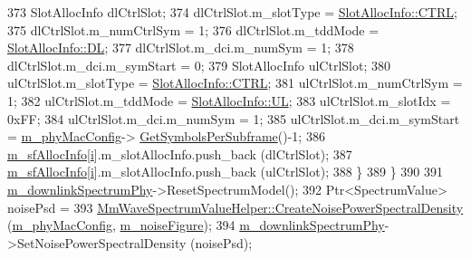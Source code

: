 \begin{DoxyCode}
373                         SlotAllocInfo dlCtrlSlot;
374                         dlCtrlSlot.m\_slotType = \hyperlink{structns3_1_1SlotAllocInfo_a3ea7cb503bfd0c9a4df55a71b81b9331ad78b7d76ef82d56c33be1fa9c1867409}{SlotAllocInfo::CTRL};
375                         dlCtrlSlot.m\_numCtrlSym = 1;
376                         dlCtrlSlot.m\_tddMode = \hyperlink{structns3_1_1SlotAllocInfo_a6cad60db1d39034f1851e2cea625fe5da9a365c9c56b7c32dcae38ee1a468ce6d}{SlotAllocInfo::DL};
377                         dlCtrlSlot.m\_dci.m\_numSym = 1;
378                         dlCtrlSlot.m\_dci.m\_symStart = 0;
379                         SlotAllocInfo ulCtrlSlot;
380                         ulCtrlSlot.m\_slotType = \hyperlink{structns3_1_1SlotAllocInfo_a3ea7cb503bfd0c9a4df55a71b81b9331ad78b7d76ef82d56c33be1fa9c1867409}{SlotAllocInfo::CTRL};
381                         ulCtrlSlot.m\_numCtrlSym = 1;
382                         ulCtrlSlot.m\_tddMode = \hyperlink{structns3_1_1SlotAllocInfo_a6cad60db1d39034f1851e2cea625fe5da916b5be54594ead6ed677c570311cad2}{SlotAllocInfo::UL};
383                         ulCtrlSlot.m\_slotIdx = 0xFF;
384                         ulCtrlSlot.m\_dci.m\_numSym = 1;
385                         ulCtrlSlot.m\_dci.m\_symStart = \hyperlink{classns3_1_1MmWavePhy_a869abf36bbdbb94eed77ba6e4846f6e4}{m\_phyMacConfig}->
      \hyperlink{classns3_1_1MmWavePhyMacCommon_a2fe835b76e3c689defa413e395cd10cb}{GetSymbolsPerSubframe}()-1;
386                         \hyperlink{classns3_1_1MmWavePhy_a6e7002b99b8c50976033e0b96523f08c}{m\_sfAllocInfo}[\hyperlink{bernuolliDistribution_8m_a6f6ccfcf58b31cb6412107d9d5281426}{i}].m\_slotAllocInfo.push\_back (dlCtrlSlot);
387                         \hyperlink{classns3_1_1MmWavePhy_a6e7002b99b8c50976033e0b96523f08c}{m\_sfAllocInfo}[\hyperlink{bernuolliDistribution_8m_a6f6ccfcf58b31cb6412107d9d5281426}{i}].m\_slotAllocInfo.push\_back (ulCtrlSlot);
388                 \}
389         \}
390 
391         \hyperlink{classns3_1_1MmWavePhy_aa266d9d20ba903f9adf2695dd626b885}{m\_downlinkSpectrumPhy}->ResetSpectrumModel();
392         Ptr<SpectrumValue> noisePsd =
393                         
      \hyperlink{classns3_1_1MmWaveSpectrumValueHelper_ae17f7f89a0ce6934b94886b463c6db44}{MmWaveSpectrumValueHelper::CreateNoisePowerSpectralDensity}
       (\hyperlink{classns3_1_1MmWavePhy_a869abf36bbdbb94eed77ba6e4846f6e4}{m\_phyMacConfig}, \hyperlink{classns3_1_1MmWavePhy_ac3010f7611906c8dc5e93bc13ff79819}{m\_noiseFigure});
394         \hyperlink{classns3_1_1MmWavePhy_aa266d9d20ba903f9adf2695dd626b885}{m\_downlinkSpectrumPhy}->SetNoisePowerSpectralDensity (noisePsd);    

\end{DoxyCode}
